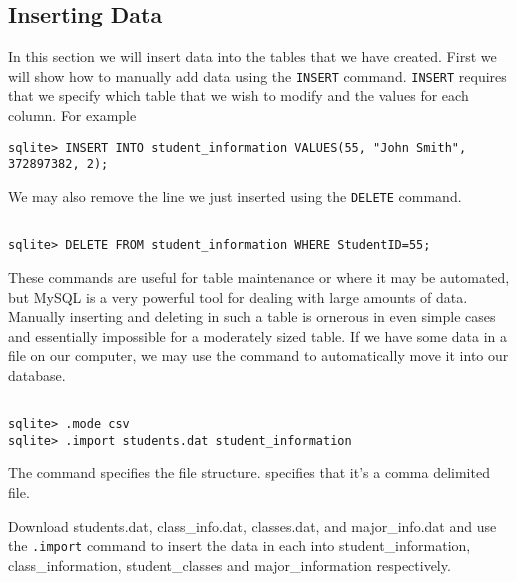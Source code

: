 \subsection{Inserting Data}

In this section we will insert data into the tables that we have created.  First we will show how to manually add data using the {\tt INSERT} command.  {\tt INSERT} requires that we specify which table that we wish to modify and the values for each column.  For example

\begin{lstlisting}
sqlite> INSERT INTO student_information VALUES(55, "John Smith", 372897382, 2);
\end{lstlisting}

We may also remove the line we just inserted using the {\tt DELETE} command.

\begin{lstlisting}

sqlite> DELETE FROM student_information WHERE StudentID=55;

\end{lstlisting}

These commands are useful for table maintenance or where it may be automated, but MySQL is a very powerful tool for dealing with large amounts of data.  Manually inserting and deleting in such a table is ornerous in even simple cases and essentially impossible for a moderately sized table.  If we have some data in a file on our computer, we may use the  command to automatically move it into our database.

\begin{lstlisting}

sqlite> .mode csv
sqlite> .import students.dat student_information

\end{lstlisting}

The  command specifies the file structure.  specifies that it's a comma delimited file.

\begin{problem}

Download students.dat, class\_info.dat, classes.dat, and major\_info.dat and use the {\tt .import} command to insert the data in each into student\_information, class_information, student\_classes and major_information respectively.

\end{problem}

